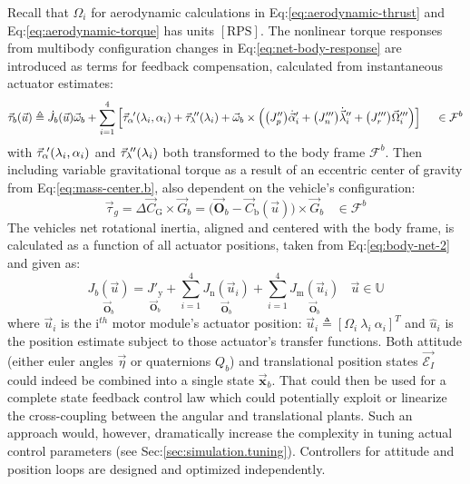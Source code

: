 Recall that $\Omega_i$ for aerodynamic calculations in Eq:\ref{eq:aerodynamic-thrust} and Eq:\ref{eq:aerodynamic-torque} has units $[\text{RPS}]$. The nonlinear torque responses from multibody configuration changes in Eq:\ref{eq:net-body-response} are introduced as terms for  feedback compensation, calculated from instantaneous actuator estimates:
\begin{equation}\label{eq:actuator-torque}
\vec{\tau}_b(\vec{u})\triangleq\dot{J}_b(\vec{u})\vec{\omega}_b+\sum_{i=1}^{4}\Big[\vec{\tau}_\alpha\hspace{-1pt}'(\lambda_i,\alpha_i)+\vec{\tau}_\lambda\hspace{-2pt}''(\lambda_i)+\vec{\omega}_b\times\Big(\big(J_p''\big)\dot{\vec{\alpha}}_i'+\big(J_n'''\big)\dot{\vec{\lambda}}_i''+\big(J_r'''\big)\vec{\Omega}_i'''\Big)\Big]~~~~\in\mathcal{F}^b
\end{equation}
with $\vec{\tau}_\alpha\hspace{-2pt}'(\lambda_i,\alpha_i)$ and $\vec{\tau}_\lambda\hspace{-2pt}''(\lambda_i)$ both transformed to the body frame $\mathcal{F}^b$. Then including variable gravitational torque as a result of an eccentric center of gravity from Eq:\ref{eq:mass-center.b}, also dependent on the vehicle's configuration:
\begin{equation}\label{eq:consolidated-grav-torque}
\vec{\tau}_g=\Delta \vec{C}_\text{G} \times\vec{G}_b=\big(\vec{\mathbf{O}}_b-\vec{C}_\text{b}(\vec{u})\big)\times\vec{G}_b~~~~\in\mathcal{F}^b
\end{equation}
The vehicles net rotational inertia, aligned and centered with the body frame, is calculated as a function of all actuator positions, taken from Eq:\ref{eq:body-net-2} and given as:
\begin{equation}
\underset{\vec{\mathbf{O}}_b}{J_b(\vec{u})}=\underset{\vec{\mathbf{O}}_b}{J'_\text{y}}+\sum_{i=1}^{4} \underset{\vec{\mathbf{O}}_b}{J_\text{n}(\vec{u}_i)}+\sum_{i=1}^{4} \underset{\vec{\mathbf{O}}_b}{J_\text{m}(\vec{u}_i)}~~~~\vec{u}\in\mathbb{U}
\end{equation}
where $\vec{u}_i$ is the $\text{i}^{th}$ motor module's actuator position: $\vec{u}_i\triangleq [\Omega_i~\lambda_i~\alpha_i]^T$ and $\hat{u}_i$ is the position estimate subject to those actuator's transfer functions. Both attitude (either euler angles $\vec{\eta}$ or quaternions $Q_b$) and translational position states $\vec{\mathcal{E}_I}$ could indeed be combined into a single state $\vec{\mathbf{x}}_b$. That could then be used for a complete state feedback control law which could potentially exploit or linearize the cross-coupling between the angular and translational plants. Such an approach would, however, dramatically increase the complexity in tuning actual control parameters (see Sec:\ref{sec:simulation.tuning}). Controllers for attitude and position loops are designed and optimized independently.